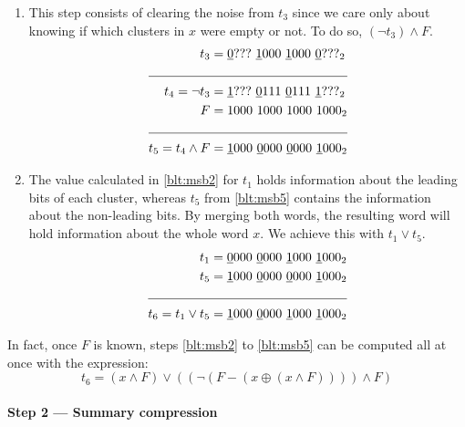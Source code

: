 \begin{enumerate}
    \item \label{blt:msb5}
    This step consists of clearing the noise from $t_3$ since we care only about knowing if which clusters in $x$ were empty or not. To do so, $(\neg t_3) \wedge F$.
    \begin{align*}
                       t_3 &= \underline{0}???\ \underline{1}000\ \underline{1}000\ \underline{0}???_2 \\ \cline{1-2} 
            t_4 = \neg t_3 &= \underline{1}???\ \underline{0}111\ \underline{0}111\ \underline{1}???_2 \\
                         F &= 1000\ 1000\ 1000\ 1000_2 \\ \cline{1-2} 
        t_5 = t_4 \wedge F &= \underline{1}000\ \underline{0}000\ \underline{0}000\ \underline{1}000_2
    \end{align*}
    
    \item \label{blt:msb6}
    The value calculated in \ref{blt:msb2} for $t_1$ holds information about the leading bits of each cluster, whereas $t_5$ from \ref{blt:msb5} contains the information about the non-leading bits. By merging both words, the resulting word will hold information about the whole word $x$. We achieve this with $t_1 \vee t_5$.
    \begin{align*}
                       t_1 &= \underline{0}000\ \underline{0}000\ \underline{1}000\ \underline{1}000_2 \\
                       t_5 &= \underline{1}000\ \underline{0}000\ \underline{0}000\ \underline{1}000_2 \\ \cline{1-2} 
        t_6 = t_1 \vee t_5 &= \underline{1}000\ \underline{0}000\ \underline{1}000\ \underline{1}000_2
    \end{align*}
\end{enumerate}

In fact, once $F$ is known, steps \ref{blt:msb2} to \ref{blt:msb5} can be computed all at once with the expression:
\begin{equation}
    t_6 = (x \wedge F) \vee ((\neg(F - (x \oplus(x \wedge F)))) \wedge F)
\end{equation}

\paragraph{Step 2 --- Summary compression} \label{sec:summaryCompression}

